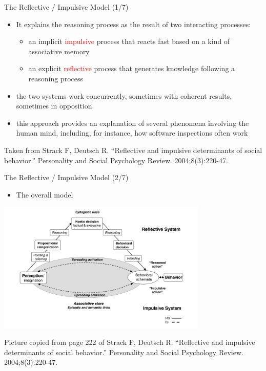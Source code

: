 \documentclass{beamer}
\begin{document}
\begin{frame}
{\centerline{The Reflective / Impulsive Model (1/7)}}
\begin{itemize}
\item It explains the reasoning process as the result of two interacting processes:
\begin{itemize}
\item an implicit \textcolor{red}{impulsive} process that reacts fast based on a kind of associative memory
\item an explicit \textcolor{red}{reflective} process that generates knowledge following a reasoning process
   \end{itemize} 
\item the two systems work concurrently, sometimes with coherent results, sometimes in opposition
\item this approach provides an explanation of several phenomena involving the human mind, including, for instance, how software inspections often work 
   \end{itemize} 
\begin{center}
    \tiny{Taken from Strack F, Deutsch R. ``Reflective and impulsive determinants of social behavior.'' Personality and Social Psychology Review. 2004;8(3):220-47.}
\end{center}

\end{frame}

\begin{frame}
{\centerline{The Reflective / Impulsive Model (2/7)}}
\begin{itemize}
    \item The overall model
\end{itemize} 

\begin{center}

 \includegraphics[width=10cm]{P2023.AIBCCSS.KnowledgeAcquisitionRetentionUse/RI.HowItWorks.jpg}
 
 \end{center}


\begin{center}
    \tiny{Picture copied from page 222 of Strack F, Deutsch R. ``Reflective and impulsive determinants of social behavior.'' Personality and Social Psychology Review. 2004;8(3):220-47.}
    \end{center}

\end{frame}
\end{document}
